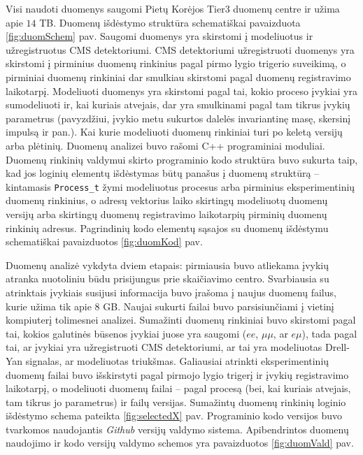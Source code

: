 \documentclass[a4paper, 12pt, twoside]{article}
\newcommand{\ttt}[1]{\texttt{#1}}
\newcommand{\emu}{e\mu}
\begin{document}
Visi naudoti duomenys saugomi Pietų Korėjos Tier3 duomenų centre ir užima apie $14$ TB.
Duomenų išdėstymo struktūra schematiškai pavaizduota \ref{fig:duomSchem} pav.
Saugomi duomenys yra skirstomi į modeliuotus ir užregistruotus CMS detektoriumi.
CMS detektoriumi užregistruoti duomenys yra skirstomi į pirminius duomenų rinkinius pagal pirmo lygio trigerio
suveikimą, o pirminiai duomenų rinkiniai dar smulkiau skirstomi pagal duomenų registravimo laikotarpį.
Modeliuoti duomenys yra skirstomi pagal tai, kokio proceso įvykiai yra sumodeliuoti ir, kai kuriais atvejais,
dar yra smulkinami pagal tam tikrus įvykių parametrus (pavyzdžiui, įvykio metu sukurtos dalelės invariantinę masę,
skersinį impulsą ir pan.).
Kai kurie modeliuoti duomenų rinkiniai turi po keletą versijų arba plėtinių.
Duomenų analizei buvo rašomi C++ programiniai moduliai.
Duomenų rinkinių valdymui skirto programinio kodo struktūra buvo sukurta taip, kad jos loginių elementų išdėstymas
būtų panašus į duomenų struktūrą -- kintamasis \ttt{Process\_t} žymi modeliuotus procesus arba pirminius
eksperimentinių duomenų rinkinius, o adresų vektorius laiko skirtingų modeliuotų duomenų versijų arba skirtingų
duomenų registravimo laikotarpių pirminių duomenų rinkinių adresus.
Pagrindinių kodo elementų sąsajos su duomenų išdėstymu schematiškai pavaizduotos \ref{fig:duomKod} pav.

Duomenų analizė vykdyta dviem etapais: pirmiausia buvo atliekama įvykių atranka nuotoliniu būdu prisijungus
prie skaičiavimo centro.
Svarbiausia su atrinktais įvykiais susijusi informacija buvo įrašoma į naujus duomenų failus, kurie užima tik
apie $8$ GB.
Naujai sukurti failai buvo parsisiunčiami į vietinį kompiuterį tolimesnei analizei.
Sumažinti duomenų rinkiniai buvo skirstomi pagal tai, kokios galutinės būsenos įvykiai juose yra saugomi
($ee$, $\mu\mu$, ar $\emu$), tada pagal tai, ar įvykiai yra užregistruoti CMS detektoriumi, ar tai yra modeliuotas
Drell-Yan signalas, ar modeliuotas triukšmas.
Galiausiai atrinkti eksperimentinių duomenų failai buvo išskirstyti pagal pirmojo lygio trigerį ir įvykių
registravimo laikotarpį, o modeliuoti duomenų failai -- pagal procesą (bei, kai kuriais atvejais, tam tikrus
jo parametrus) ir failų versijas.
Sumažintų duomenų rinkinių loginio išdėstymo schema pateikta \ref{fig:selectedX} pav.
Programinio kodo versijos buvo tvarkomos naudojantis \textit{Github} versijų valdymo sistema.
Apibendrintos duomenų naudojimo ir kodo versijų valdymo schemos yra pavaizduotos \ref{fig:duomVald} pav.
\end{document}
